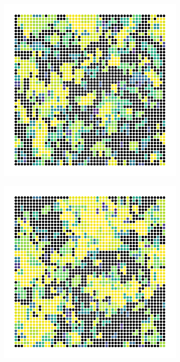 \documentclass[twoside,10pt]{article}
\begin{document}
\begin{figure}[H]
	\centering
	\begin{subfigure}
		\centering
		\includegraphics[scale=0.45]{fig/precrit.pdf}
	\end{subfigure}
	\begin{subfigure}
		\centering
		\includegraphics[scale=0.45]{fig/crit.pdf}

\end{subfigure}
\end{figure}
\end{document}
